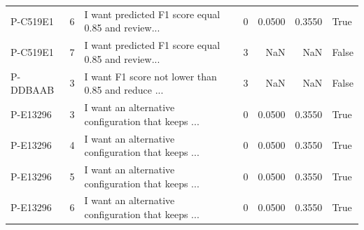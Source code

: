 \begin{tabular}{lrlrrrl}
   P-C519E1 &        6 & I want predicted F1 score equal 0.85 and review... &          0 &              0.0500 &         0.3550 &                True \\
   P-C519E1 &        7 & I want predicted F1 score equal 0.85 and review... &          3 &                 NaN &            NaN &               False \\
   P-DDBAAB &        3 & I want F1 score not lower than 0.85 and reduce ... &          3 &                 NaN &            NaN &               False \\
   P-E13296 &        3 & I want an alternative configuration that keeps ... &          0 &              0.0500 &         0.3550 &                True \\
   P-E13296 &        4 & I want an alternative configuration that keeps ... &          0 &              0.0500 &         0.3550 &                True \\
   P-E13296 &        5 & I want an alternative configuration that keeps ... &          0 &              0.0500 &         0.3550 &                True \\
   P-E13296 &        6 & I want an alternative configuration that keeps ... &          0 &              0.0500 &         0.3550 &                True \\
\bottomrule
\end{tabular}

